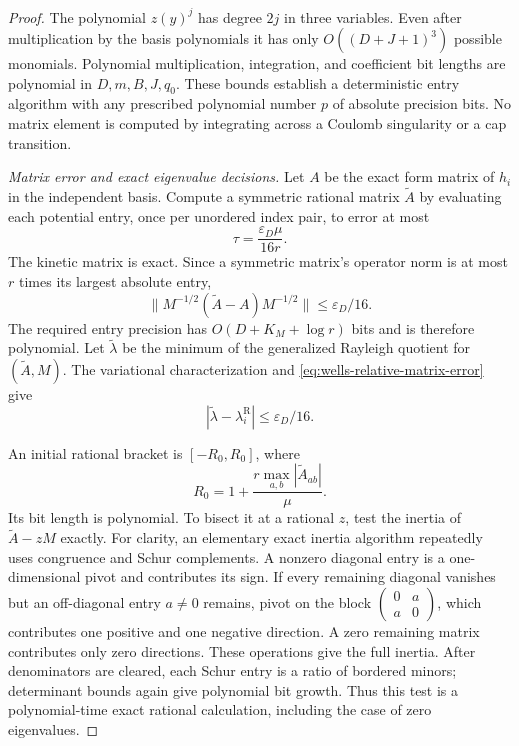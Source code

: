 \begin{proof}
The polynomial \(z(y)^j\) has degree \(2j\) in three variables.
Even after multiplication by the basis polynomials it has only
\(O((D+J+1)^3)\) possible monomials. Polynomial multiplication,
integration, and coefficient bit lengths are polynomial in
\(D,m,B,J,q_0\). These bounds establish a deterministic entry
algorithm with any prescribed polynomial number \(p\) of absolute
precision bits. No matrix element is computed by integrating
across a Coulomb singularity or a cap transition.

\smallskip\noindent
\emph{Matrix error and exact eigenvalue decisions.}
Let \(A\) be the exact form matrix of \(h_i\) in the independent basis.
Compute a symmetric rational matrix \(\widetilde A\) by evaluating
each potential entry, once per unordered index pair, to error at most
\[
 \tau=\frac{\varepsilon_D\mu}{16r}.
\]
The kinetic matrix is exact. Since a symmetric matrix's operator
norm is at most \(r\) times its largest absolute entry,
\begin{equation}
 \|M^{-1/2}(\widetilde A-A)M^{-1/2}\|
 \le\varepsilon_D/16.
 \label{eq:wells-relative-matrix-error}
\end{equation}
The required entry precision has
\(O(D+K_M+\log r)\) bits and is therefore polynomial.
Let \(\widetilde\lambda\) be the minimum of the generalized
Rayleigh quotient for \((\widetilde A,M)\).
The variational characterization and
\eqref{eq:wells-relative-matrix-error} give
\[
 |\widetilde\lambda-\lambda_i^{\mathrm R}|
 \le\varepsilon_D/16.
\]

An initial rational bracket is \([-R_0,R_0]\), where
\[
 R_0=1+\frac{r\max_{a,b}|\widetilde A_{ab}|}{\mu}.
\]
Its bit length is polynomial. To bisect it at a rational \(z\),
test the inertia of \(\widetilde A-zM\) exactly.
For clarity, an elementary exact inertia algorithm repeatedly
uses congruence and Schur complements. A nonzero diagonal entry
is a one-dimensional pivot and contributes its sign. If every
remaining diagonal vanishes but an off-diagonal entry \(a\ne0\)
remains, pivot on the block
\(\left(\begin{smallmatrix}0&a\\a&0\end{smallmatrix}\right)\),
which contributes one positive and one negative direction.
A zero remaining matrix contributes only zero directions.
These operations give the full inertia. After denominators are
cleared, each Schur entry is a ratio of bordered minors; determinant
bounds again give polynomial bit growth.
Thus this test is a polynomial-time exact rational calculation,
including the case of zero eigenvalues.


\end{proof}
